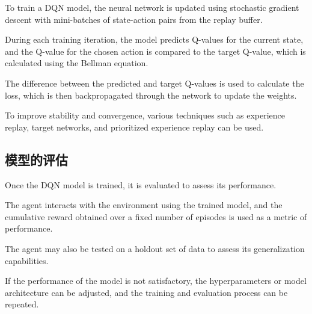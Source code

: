 To train a DQN model, the neural network is updated using stochastic gradient descent with mini-batches of state-action pairs from the replay buffer.

During each training iteration, the model predicts Q-values for the current state, and the Q-value for the chosen action is compared to the target Q-value, which is calculated using the Bellman equation.

The difference between the predicted and target Q-values is used to calculate the loss, which is then backpropagated through the network to update the weights.

To improve stability and convergence, various techniques such as experience replay, target networks, and prioritized experience replay can be used.

\subsection{模型的评估}

Once the DQN model is trained, it is evaluated to assess its performance.

The agent interacts with the environment using the trained model, and the cumulative reward obtained over a fixed number of episodes is used as a metric of performance.

The agent may also be tested on a holdout set of data to assess its generalization capabilities.

If the performance of the model is not satisfactory, the hyperparameters or model architecture can be adjusted, and the training and evaluation process can be repeated.